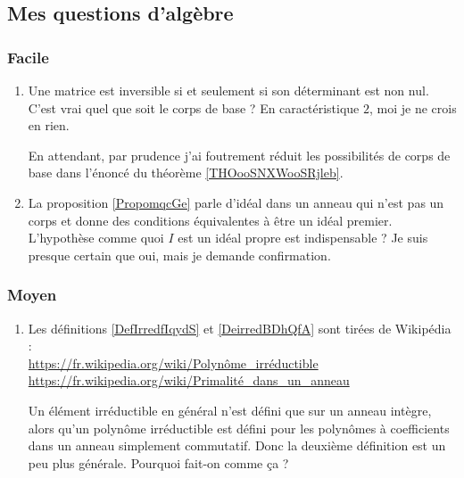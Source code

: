\subsection{Mes questions d'algèbre}

\subsubsection{Facile}

\begin{enumerate}
    \item
        Une matrice est inversible si et seulement si son déterminant est non nul. C'est vrai quel que soit le corps de base ? En caractéristique \( 2\), moi je ne crois en rien.

        En attendant, par prudence j'ai foutrement réduit les possibilités de corps de base dans l'énoncé du théorème \ref{THOooSNXWooSRjleb}.
    \item
        La proposition \ref{PropomqcGe} parle d'idéal dans un anneau qui n'est pas un corps et donne des conditions équivalentes à être un idéal premier. L'hypothèse comme quoi \( I\) est un idéal propre est indispensable ? Je suis presque certain que oui, mais je demande confirmation.
\end{enumerate}

\subsubsection{Moyen}

\begin{enumerate}
    \item
        Les définitions \ref{DefIrredfIqydS} et \ref{DeirredBDhQfA} sont tirées de Wikipédia :\\
        \url{https://fr.wikipedia.org/wiki/Polynôme_irréductible}\\
        \url{https://fr.wikipedia.org/wiki/Primalité_dans_un_anneau}

        Un élément irréductible en général n'est défini que sur un anneau intègre, alors qu'un polynôme irréductible est défini pour les polynômes à coefficients dans un anneau simplement commutatif. Donc la deuxième définition est un peu plus générale. Pourquoi fait-on comme ça ?

\end{enumerate}

